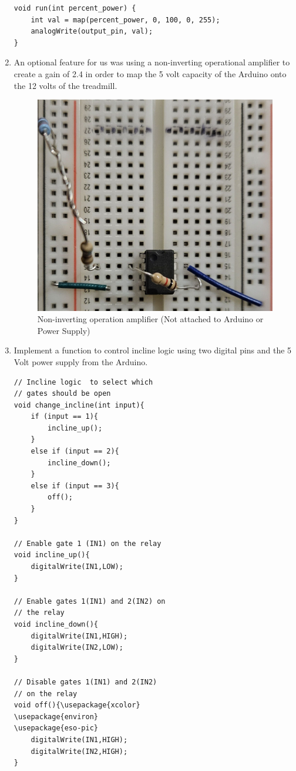 \documentclass[journal]{IEEEtran}
\begin{document}
\begin{enumerate}
\begin{lstlisting}[language=Arduino]
void run(int percent_power) {
    int val = map(percent_power, 0, 100, 0, 255);
    analogWrite(output_pin, val);
}
\end{lstlisting}
\item An optional feature for us was using a non-inverting operational amplifier to create a gain of 2.4 in order to map the 5 volt capacity of the Arduino onto the 12 volts of the treadmill.
    \begin{figure}[H]
            \centering
            \includegraphics[width=0.5\linewidth]{Op_Amp.jpg}
            \caption{Non-inverting operation amplifier (Not attached to Arduino or Power Supply)}
            \label{fig:5}
    \end{figure}

\vfill\eject

\item Implement a function to control incline logic using two digital pins and the 5 Volt power supply from the Arduino.
\begin{lstlisting}[language=Arduino]
// Incline logic  to select which 
// gates should be open
void change_incline(int input){
    if (input == 1){
        incline_up();
    }
    else if (input == 2){
        incline_down();
    }
    else if (input == 3){
        off();
    }
}

// Enable gate 1 (IN1) on the relay
void incline_up(){
    digitalWrite(IN1,LOW);
}

// Enable gates 1(IN1) and 2(IN2) on 
// the relay
void incline_down(){
    digitalWrite(IN1,HIGH);
    digitalWrite(IN2,LOW);
}

// Disable gates 1(IN1) and 2(IN2)
// on the relay
void off(){\usepackage{xcolor}
\usepackage{environ}
\usepackage{eso-pic}
    digitalWrite(IN1,HIGH);
    digitalWrite(IN2,HIGH);
}

\end{lstlisting}


\end{enumerate}
\end{document}
